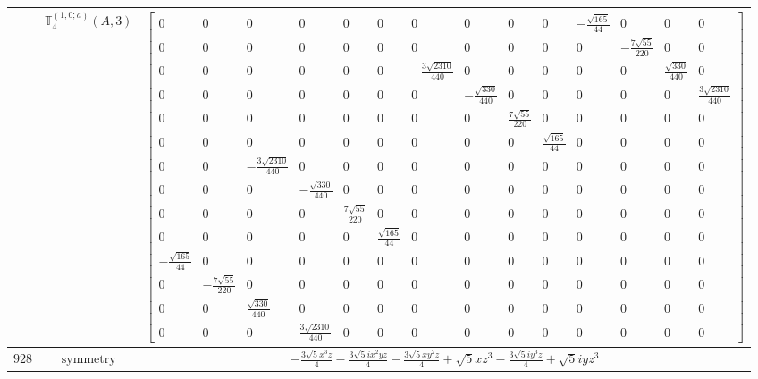 \documentclass[fleqn,8pt,landscape]{jsarticle}
\begin{document}
\begin{longtable}{ccc}
$  $ & $ \mathbb{T}_{4}^{(1,0;a)}(A,3) $ & $ \begin{bmatrix} 0 & 0 & 0 & 0 & 0 & 0 & 0 & 0 & 0 & 0 & - \frac{\sqrt{165}}{44} & 0 & 0 & 0 \\ 0 & 0 & 0 & 0 & 0 & 0 & 0 & 0 & 0 & 0 & 0 & - \frac{7 \sqrt{55}}{220} & 0 & 0 \\ 0 & 0 & 0 & 0 & 0 & 0 & - \frac{3 \sqrt{2310}}{440} & 0 & 0 & 0 & 0 & 0 & \frac{\sqrt{330}}{440} & 0 \\ 0 & 0 & 0 & 0 & 0 & 0 & 0 & - \frac{\sqrt{330}}{440} & 0 & 0 & 0 & 0 & 0 & \frac{3 \sqrt{2310}}{440} \\ 0 & 0 & 0 & 0 & 0 & 0 & 0 & 0 & \frac{7 \sqrt{55}}{220} & 0 & 0 & 0 & 0 & 0 \\ 0 & 0 & 0 & 0 & 0 & 0 & 0 & 0 & 0 & \frac{\sqrt{165}}{44} & 0 & 0 & 0 & 0 \\ 0 & 0 & - \frac{3 \sqrt{2310}}{440} & 0 & 0 & 0 & 0 & 0 & 0 & 0 & 0 & 0 & 0 & 0 \\ 0 & 0 & 0 & - \frac{\sqrt{330}}{440} & 0 & 0 & 0 & 0 & 0 & 0 & 0 & 0 & 0 & 0 \\ 0 & 0 & 0 & 0 & \frac{7 \sqrt{55}}{220} & 0 & 0 & 0 & 0 & 0 & 0 & 0 & 0 & 0 \\ 0 & 0 & 0 & 0 & 0 & \frac{\sqrt{165}}{44} & 0 & 0 & 0 & 0 & 0 & 0 & 0 & 0 \\ - \frac{\sqrt{165}}{44} & 0 & 0 & 0 & 0 & 0 & 0 & 0 & 0 & 0 & 0 & 0 & 0 & 0 \\ 0 & - \frac{7 \sqrt{55}}{220} & 0 & 0 & 0 & 0 & 0 & 0 & 0 & 0 & 0 & 0 & 0 & 0 \\ 0 & 0 & \frac{\sqrt{330}}{440} & 0 & 0 & 0 & 0 & 0 & 0 & 0 & 0 & 0 & 0 & 0 \\ 0 & 0 & 0 & \frac{3 \sqrt{2310}}{440} & 0 & 0 & 0 & 0 & 0 & 0 & 0 & 0 & 0 & 0 \end{bmatrix} $ \\ \hline
$ 928 $ & $ \text{symmetry} $ & $ - \frac{3 \sqrt{5} x^{3} z}{4} - \frac{3 \sqrt{5} i x^{2} y z}{4} - \frac{3 \sqrt{5} x y^{2} z}{4} + \sqrt{5} x z^{3} - \frac{3 \sqrt{5} i y^{3} z}{4} + \sqrt{5} i y z^{3} $ \\

\end{longtable}
\end{document}
